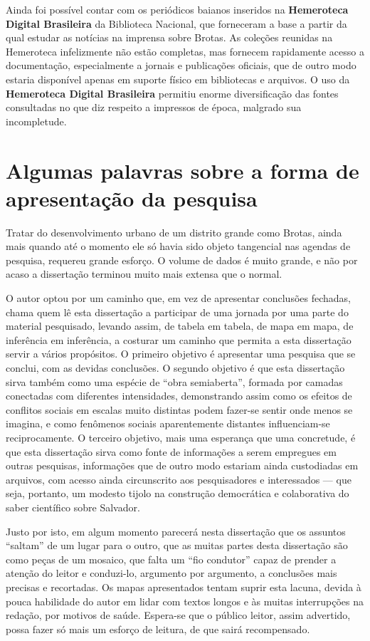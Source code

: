 Ainda foi possível contar com os periódicos baianos inseridos na \textbf{Hemeroteca Digital Brasileira} da Biblioteca Nacional, que forneceram a base a partir da qual estudar as notícias na imprensa sobre Brotas. As coleções reunidas na Hemeroteca infelizmente não estão completas, mas fornecem rapidamente acesso a documentação, especialmente a jornais e publicações oficiais, que de outro modo estaria disponível apenas em suporte físico em bibliotecas e arquivos. O uso da \textbf{Hemeroteca Digital Brasileira} permitiu enorme diversificação das fontes consultadas no que diz respeito a impressos de época, malgrado sua incompletude.

\section{Algumas palavras sobre a forma de apresentação da pesquisa}

Tratar do desenvolvimento urbano de um distrito grande como Brotas, ainda mais quando até o momento ele só havia sido objeto tangencial nas agendas de pesquisa, requereu grande esforço. O volume de dados é muito grande, e não por acaso a dissertação terminou muito mais extensa que o normal.

O autor optou por um caminho que, em vez de apresentar conclusões fechadas, chama quem lê esta dissertação a participar de uma jornada por uma parte do material pesquisado, levando assim, de tabela em tabela, de mapa em mapa, de inferência em inferência, a costurar um caminho que permita a esta dissertação servir a vários propósitos. O primeiro objetivo é apresentar uma pesquisa que se conclui, com as devidas conclusões. O segundo objetivo é que esta dissertação sirva também como uma espécie de ``obra semiaberta'', formada por camadas conectadas com diferentes intensidades, demonstrando assim como os efeitos de conflitos sociais em escalas muito distintas podem fazer-se sentir onde menos se imagina, e como fenômenos sociais aparentemente distantes influenciam-se reciprocamente. O terceiro objetivo, mais uma esperança que uma concretude, é que esta dissertação sirva como fonte de informações a serem empregues em outras pesquisas, informações que de outro modo estariam ainda custodiadas em arquivos, com acesso ainda circunscrito aos pesquisadores e interessados --- que seja, portanto, um modesto tijolo na construção democrática e colaborativa do saber científico sobre Salvador.

Justo por isto, em algum momento parecerá nesta dissertação que os assuntos ``saltam'' de um lugar para o outro, que as muitas partes desta dissertação são como peças de um mosaico, que falta um ``fio condutor'' capaz de prender a atenção do leitor e conduzi-lo, argumento por argumento, a conclusões mais precisas e recortadas. Os mapas apresentados tentam suprir esta lacuna, devida à pouca habilidade do autor em lidar com textos longos e às muitas interrupções na redação, por motivos de saúde. Espera-se que o público leitor, assim advertido, possa fazer só mais um esforço de leitura, de que sairá recompensado.